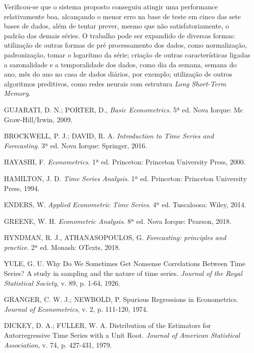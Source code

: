\documentclass[twocolumn]{rbef}
\newcommand{\1}{\mathbbm{1}}
\begin{document}
Verificou-se que o sistema proposto conseguiu atingir uma performance relativamente boa, alcançando o menor erro na base de teste em cinco das sete bases de dados, além de tentar prever, mesmo que não satisfatoriamente, o padrão das demais séries. O trabalho pode ser expandido de diversas formas: utilização de outras formas de pré processamento dos dados, como normalização, padronização, tomar o logarítmo da série; criação de outras características ligadas a sazonalidade e a temporalidade dos dados, como dia da semana, semana do ano, mês do ano no casa de dados diários, por exemplo; utilização de outros algoritmos preditivos, como redes neurais com estrutura \textit{Long Short-Term Memory}.


\begin{thebibliography}{99}
  

 GUJARATI, D. N.; PORTER, D., \textit{Basic Econometrics}. 5ª ed. Nova Iorque: Mc Graw-Hill/Irwin, 2009.

 BROCKWELL, P. J.; DAVID, R. A. \textit{Introduction to Time Series and Forecasting}. 3ª ed. Nova Iorque: Springer, 2016.

 HAYASHI, F. \textit{Econometrics}. 1ª ed. Princeton: Princeton University Press, 2000.

 HAMILTON, J. D. \textit{Time Series Analysis}. 1ª ed. Princeton: Princeton University Press, 1994.

 ENDERS, W. \textit{Applied Econometric Time Series}. 4ª ed. Tuscaloosa: Wiley, 2014.

 GREENE, W. H. \textit{Econometric Analysis}. 8ª ed. Nova Iorque: Pearson, 2018.

 HYNDMAN, R. J., ATHANASOPOULOS, G. \textit{Forecasting: principles and practice}. 2ª ed. Monash: OTexts, 2018.

 YULE, G. U. Why Do We Sometimes Get Nonsense Correlations Between Time Series? A study in sampling and the nature of time series. \textit{Journal of the Royal Statistical Society}, v. 89, p. 1-64, 1926.

 GRANGER, C. W. J.; NEWBOLD, P. Spurious Regressions in Econometrics. \textit{Journal of Econometrics}, v. 2, p. 111-120, 1974.

 DICKEY, D. A.; FULLER, W. A. Distribution of the Estimators for Autorregressive Time Series with a Unit Root. \textit{Journal of American Statistical Association}, v. 74, p. 427-431, 1979.


\end{thebibliography}
\end{document}
